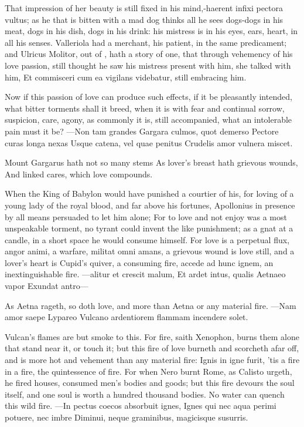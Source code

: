That impression of her beauty is still fixed in his mind,-haerent
infixi pectora vultus; as he that is bitten with a mad dog thinks all
he sees dogs-dogs in his meat, dogs in his dish, dogs in his drink: his
mistress is in his eyes, ears, heart, in all his senses. Valleriola had
a merchant, his patient, in the same predicament; and Ulricus
Molitor, out of \Austin{}, hath a story of one, that through vehemency of
his love passion, still thought he saw his mistress present with him,
she talked with him, Et commisceri cum ea vigilans videbatur, still
embracing him.

Now if this passion of love can produce such effects, if it be
pleasantly intended, what bitter torments shall it breed, when it is
with fear and continual sorrow, suspicion, care, agony, as commonly it
is, still accompanied, what an intolerable pain must it be?
---Non tam grandes
Gargara culmos, quot demerso
Pectore curas longa nexas
Usque catena, vel quae penitus
Crudelis amor vulnera miscet.

Mount Gargarus hath not so many stems
As lover's breast hath grievous wounds,
And linked cares, which love compounds.

When the King of Babylon would have punished a courtier of his, for
loving of a young lady of the royal blood, and far above his fortunes,
 Apollonius in presence by all means persuaded to let him alone;
For to love and not enjoy was a most unspeakable torment, no tyrant
could invent the like punishment; as a gnat at a candle, in a short
space he would consume himself. For love is a perpetual flux,
angor animi, a warfare, militat omni amans, a grievous wound is love
still, and a lover's heart is Cupid's quiver, a consuming fire,
accede ad hunc ignem, \etc{} an inextinguishable fire.
---alitur et crescit malum,
Et ardet intus, qualis Aetnaeo vapor
Exundat antro---

As Aetna rageth, so doth love, and more than Aetna or any material
fire.
---Nam amor saepe Lypareo
Vulcano ardentiorem flammam incendere solet.

Vulcan's flames are but smoke to this. For fire, saith Xenophon,
burns them alone that stand near it, or touch it; but this fire of love
burneth and scorcheth afar off, and is more hot and vehement than any
material fire: Ignis in igne furit, 'tis a fire in a fire, the
quintessence of fire. For when Nero burnt Rome, as Calisto urgeth, he
fired houses, consumed men's bodies and goods; but this fire devours
the soul itself, and one soul is worth a hundred thousand bodies.
No water can quench this wild fire.
---In pectus coecos absorbuit ignes,
Ignes qui nec aqua perimi potuere, nec imbre
Diminui, neque graminibus, magicisque susurris.


